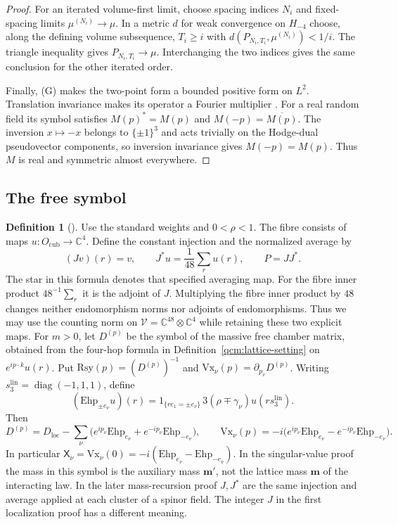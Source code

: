 \documentclass[11pt,letterpaper,reqno]{amsart}
\theoremstyle{definition}
\newtheorem{qcmdefinition}[qcmproposition]{Definition}
\newenvironment{definition}[1][]{\pushQED{\qed}\renewcommand{\qedsymbol}{$\blacksquare$}\begin{qcmdefinition}[#1]}{\popQED\end{qcmdefinition}}
\begin{document}
\begin{proof}
For an iterated volume-first limit, choose spacing indices $N_i$
and fixed-spacing limits $\mu^{(N_i)}\to\mu$. In a metric $d$ for
weak convergence on $H_{-4}$ choose, along the defining volume
subsequence, $T_i\ge i$ with
$d(P_{N_i,T_i},\mu^{(N_i)})<1/i$. The triangle inequality gives
$P_{N_i,T_i}\to\mu$. Interchanging the two indices gives the same
conclusion for the other iterated order.

Finally, \textup{(G)} makes the two-point form a bounded positive
form on $L^2$. Translation invariance makes its operator a Fourier
multiplier \cite[Chapter~I, Theorem~3.18]{SteinWeiss1971}. For a real
random field its symbol satisfies
$M(p)^*=M(p)$ and $M(-p)=\overline{M(p)}$. The inversion $x\mapsto-x$
belongs to $\{\pm1\}^3$ and acts trivially on the Hodge-dual
pseudovector components, so inversion invariance gives
$M(-p)=M(p)$. Thus $M$ is real and symmetric almost everywhere.
\end{proof}

\subsection{The free symbol}
\begin{definition}\label{qcm:lattice-symbol-setting}
Use the standard weights and $0<\rho<1$. The fibre consists of maps
$u:O_{\mathrm{cub}}\to\mathbb C^4$. Define the constant injection and
the normalized average by
\[
 (Jv)(r)=v,\qquad J^*u=\frac1{48}\sum_ru(r),\qquad P=JJ^*.
\]
The star in this formula denotes that specified averaging map.
For the fibre inner product $48^{-1}\sum_r$ it is the adjoint of
$J$. Multiplying the fibre inner product by $48$ changes neither
endomorphism norms nor adjoints of endomorphisms. Thus we may use
the counting norm on $\mathcal V=\mathbb C^{48}\otimes\mathbb C^4$
while retaining these two explicit maps.
For $m>0$, let $D^{(p)}$ be the symbol of the massive free chamber
matrix, obtained from the four-hop formula in
Definition~\ref{qcm:lattice-setting} on $e^{ip\cdot k}u(r)$.
Put $\mathrm{Rsy}(p)=(D^{(p)})^{-1}$ and
$\mathrm{Vx}_\nu(p)=\partial_{p_\nu}D^{(p)}$.
Writing $s_3^{\mathrm{lin}}=\operatorname{diag}(-1,1,1)$, define
\[
 (\mathrm{Ehp}_{\pm e_\nu}u)(r)
 =1_{\{re_1=\pm e_\nu\}}\,3(\rho\mp\gamma_\nu)
                                     u(rs_3^{\mathrm{lin}}).
\]
Then
\begin{equation}\label{qcm:lattice-symbol-vertices}
 D^{(p)}=D_{\mathrm{loc}}
   -\sum_\nu\bigl(e^{ip_\nu}\mathrm{Ehp}_{e_\nu}
                  +e^{-ip_\nu}\mathrm{Ehp}_{-e_\nu}\bigr),\qquad
 \mathrm{Vx}_\nu(p)
   =-i\bigl(e^{ip_\nu}\mathrm{Ehp}_{e_\nu}
                  -e^{-ip_\nu}\mathrm{Ehp}_{-e_\nu}\bigr).
\end{equation}
In particular $\mathsf X_\nu=\mathrm{Vx}_\nu(0)
=-i(\mathrm{Ehp}_{e_\nu}-\mathrm{Ehp}_{-e_\nu})$.
In the singular-value proof the mass in this symbol is the
auxiliary mass $\mathbf m'$, not the lattice mass $\mathbf m$ of
the interacting law. In the later mass-recursion proof $J,J^*$ are
the same injection and average applied at each cluster of a spinor
field. The integer $J$ in the first localization proof has a
different meaning.
\end{definition}
\end{document}
